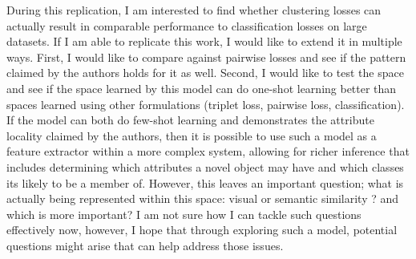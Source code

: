 \documentclass{article}
\begin{document}
During this replication, I am interested to find whether clustering losses can actually result in comparable performance to classification losses on large datasets. 
If I am able to replicate this work, I would like to extend it in multiple ways. First, I would like to compare against pairwise losses and see if the pattern claimed by the authors holds for it as well. Second, I would like to test the space and see if the space learned by this model can do one-shot learning better than spaces learned using other formulations (triplet loss, pairwise loss, classification). If the model can both do few-shot learning and demonstrates the attribute locality claimed by the authors, then it is possible to use such a model as a feature extractor within a more complex system, allowing for richer inference that includes determining which attributes a novel object may have and which classes its likely to be a member of. However, this leaves an important question; what is actually being represented within this space: visual or semantic similarity ? and which is more important? I am not sure how I can tackle such questions effectively now, however, I hope that through exploring such a model, potential questions might arise that can help address those issues. 





\end{document}
